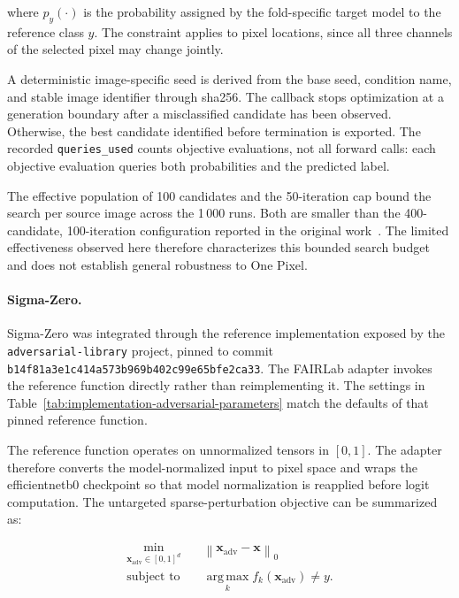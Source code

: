 where \(p_y(\cdot)\) is the probability assigned by the fold-specific target
model to the reference class \(y\). The constraint applies to pixel locations,
since all three channels of the selected pixel may change jointly.

A deterministic image-specific seed is derived from the base seed, condition
name, and stable image identifier through \gls{sha256}. The callback stops
optimization at a generation boundary after a misclassified candidate has
been observed. Otherwise, the best candidate identified before termination is
exported. The recorded \texttt{queries\_used} counts objective evaluations,
not all forward calls: each objective evaluation queries both probabilities
and the predicted label.

The effective population of 100 candidates and the 50-iteration cap bound
the search per source image across the 1\,000 runs. Both are smaller
than the 400-candidate, 100-iteration configuration reported in the original
work~\cite{su2019onepixel}. The limited effectiveness observed here therefore
characterizes this bounded search budget and does not establish general
robustness to One Pixel.

\paragraph{Sigma-Zero.}

Sigma-Zero was integrated through the reference implementation exposed by the
\texttt{adversarial-library} project, pinned to commit
\nolinkurl{b14f81a3e1c414a573b969b402c99e65bfe2ca33}. The FAIRLab adapter
invokes the reference function directly rather than reimplementing it.
The settings in Table~\ref{tab:implementation-adversarial-parameters} match
the defaults of that pinned reference function.

The reference function operates on unnormalized tensors in \([0,1]\). The
adapter therefore converts the model-normalized input to pixel space and wraps
the \gls{efficientnetb0} checkpoint so that model normalization is reapplied before
logit computation. The untargeted sparse-perturbation objective can be
summarized as:

\[
\begin{aligned}
\min_{\mathbf{x}_{\mathrm{adv}} \in [0,1]^d}\quad &
\left\|
\mathbf{x}_{\mathrm{adv}}-\mathbf{x}
\right\|_0
\\
\text{subject to}\quad &
\operatorname*{arg\,max}_{k}
f_k(\mathbf{x}_{\mathrm{adv}})
\neq
y.
\end{aligned}
\]

